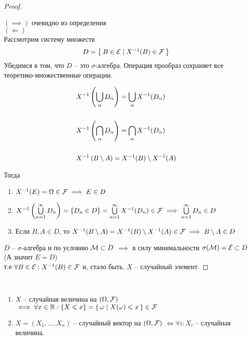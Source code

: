 \begin{proof}~

  $(\implies)$ очевидно из определения\\

  $(\Leftarrow)$ \\
  Рассмотрим систему множеств
  \begin{align*}
    D = \left\{ \, B \in \mathcal{E} \mid X^{-1}(B) \in \mathcal{F} \, \right\}
  \end{align*}
  Убедимся в том, что $D$ -- это $\sigma$-алгебра. 
  Операция прообраз сохраняет все теоретико-множественные операции.

  \begin{align*}
    &X^{-1}\left( \bigcup_{\alpha} D_{\alpha} \right) = \bigcup_{\alpha} X^{-1} (D_{\alpha})\\\\
    &X^{-1}\left( \bigcap_{\alpha} D_{\alpha} \right) = \bigcap_{\alpha} X^{-1} (D_{\alpha})\\\\
    &X^{-1}\left( B \setminus A \right) = X^{-1} (B) \setminus X^{-1} (A)
  \end{align*}

  Тогда
  \begin{enumerate}
    \item 
      $X^{-1}(E) = \Omega \in \mathcal{F} \implies E \in D$

    \item  
      $X^{-1}\left( \bigcup\limits_{n = 1}^{\infty} D_n \right) = \{ D_n \in D \} = 
      \bigcup\limits_{n = 1}^{\infty} X^{-1}(D_n) \in \mathcal{F} 
      \implies \bigcup\limits_{n = 1}^{\infty} D_n \in D$

    \item
      Если $B, A \in D$, то
      $X^{-1}(B \setminus A) = X^{-1}(B) \setminus X^{-1}(A) \in \mathcal{F} 
      \implies B \setminus A \in D$
  \end{enumerate}

  $D$ -- $\sigma$-алгебра и по условию $\mathcal{M} \subset D$
  $\implies$ в силу минимальности $\sigma(\mathcal{M}) = \mathcal{E} \subset D$ (А значит $E = D$)\\
  т.е $\forall  B \in \mathcal{E} : X^{-1}(B) \in \mathcal{F}$
  и, стало быть, $X$ -- случайный элемент.
\end{proof}

\begin{corollary}~

  \begin{enumerate}
    \item 
      $X$ -- случайная величина на $(\Omega, \mathcal{F})$
      $\iff \forall x \in \mathbb{R} :
       \{ X \leqslant x \} = 
      \left\{ \, \omega \mid X(\omega) \leqslant x \, \right\} \in \mathcal{F}$

    \item $X = (X_1, \ldots, X_n)$ -- случайный вектор на $(\Omega, \mathcal{F})$
          $\iff \forall i : X_i$ -- случайная величина.
  \end{enumerate}

\end{corollary}

